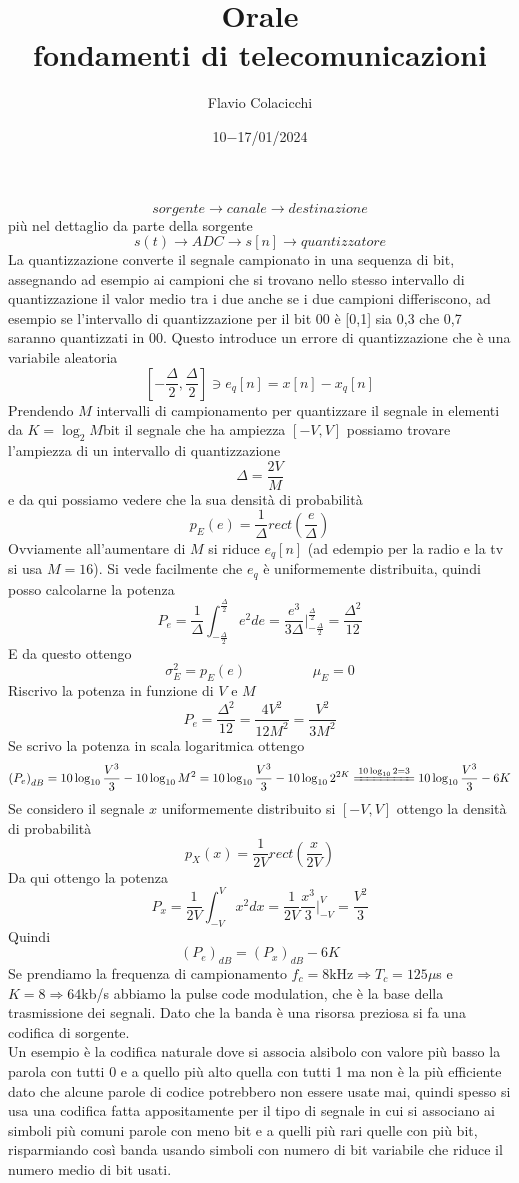 \documentclass{article}
\title{Orale\\\normalsize fondamenti di telecomunicazioni}
\author{Flavio Colacicchi}
\date{10$-$17/01/2024}
\begin{document}
\maketitle
\LARGE\[sorgente\to\boxed{canale}\to destinazione\]\normalsize
più nel dettaglio da parte della sorgente
\[s(t)\to\boxed{ADC}\to s[n]\to\boxed{quantizzatore}\]
La quantizzazione converte il segnale campionato in una sequenza di bit, assegnando ad esempio ai campioni che si trovano nello stesso intervallo di quantizzazione il valor medio tra i due anche se i due campioni differiscono, ad esempio se l'intervallo di quantizzazione per il bit 00 è [0,1] sia 0,3 che 0,7 saranno quantizzati in 00. Questo introduce un errore di quantizzazione che è una variabile aleatoria
\[\left[-\frac{\Delta}{2},\frac{\Delta}{2}\right]\ni e_q[n]=x[n]-x_q[n]\]
Prendendo \(M\) intervalli di campionamento per quantizzare il segnale in elementi da \(K=\log_{2}M\)bit il segnale che ha ampiezza \([-V,V]\) possiamo trovare l'ampiezza di un intervallo di quantizzazione
\[\Delta=\frac{2V}{M}\]
e da qui possiamo vedere che la sua densità di probabilità
\[p_E(e)=\frac{1}{\Delta}rect\left(\frac{e}{\Delta}\right)\]
Ovviamente all'aumentare di \(M\) si riduce \(e_q[n]\) (ad edempio per la radio e la tv si usa \(M=16\)). Si vede facilmente che \(e_q\) è uniformemente distribuita, quindi posso calcolarne la potenza
\[P_e=\frac{1}{\Delta}\int_{-\frac{\Delta}{2}}^\frac{\Delta}{2}e^2de=\frac{e^3}{3\Delta}\Big|_{-\frac{\Delta}{2}}^\frac{\Delta}{2}=\frac{\Delta^2}{12}\]
E da questo ottengo
\[\sigma^2_E=p_E(e)\hspace{2cm}\mu_E=0\]
Riscrivo la potenza in funzione di \(V\) e \(M\)
\[P_e=\frac{\Delta^2}{12}=\frac{4V^2}{12M^2}=\frac{V^2}{3M^2}\]
Se scrivo la potenza in scala logaritmica ottengo
\[{(P_e)}_{dB}=10\log_{10}\frac{V^3}{3}-10\log_{10}M^2=10\log_{10}\frac{V^3}{3}-10\log_{10}2^{2K}\xlongequal{10\log_{10}2=3}10\log_{10}\frac{V^3}{3}-6K\]
Se considero il segnale \(x\) uniformemente distribuito si \([-V,V]\) ottengo la densità di probabilità
\[p_X(x)=\frac{1}{2V}rect\left(\frac{x}{2V}\right)\]
Da qui ottengo la potenza
\[P_x=\frac{1}{2V}\int_{-V}^V x^2dx=\frac{1}{2V}\frac{x^3}{3}\Bigg|_{-V}^V=\frac{V^2}{3}\]
Quindi
\[{(P_e)}_{dB}={(P_x)}_{dB}-6K\]
Se prendiamo la frequenza di campionamento \(f_c=8\text{kHz}\Rightarrow T_c=125\mu\)s e \(K=8\Rightarrow 64\)kb/s abbiamo la pulse code modulation, che è la base della trasmissione dei segnali. Dato che la banda è una risorsa preziosa si fa una codifica di sorgente.\\
Un esempio è la codifica naturale dove si associa alsibolo con valore più basso la parola con tutti 0 e a quello più alto quella con tutti 1 ma non è la più efficiente dato che alcune parole di codice potrebbero non essere usate mai, quindi spesso si usa una codifica fatta appositamente per il tipo di segnale in cui si associano ai simboli più comuni parole con meno bit e a quelli più rari quelle con più bit, risparmiando così banda usando simboli con numero di bit variabile che riduce il numero medio di bit usati.\\
\end{document}
